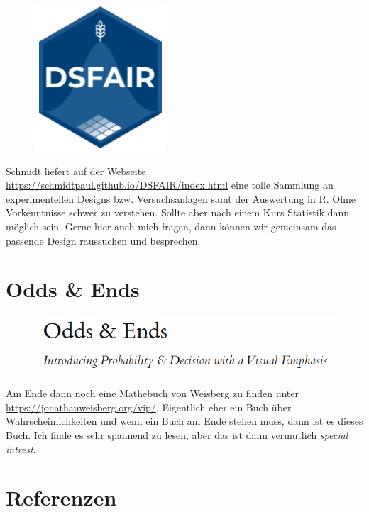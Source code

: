 \documentclass[
  letterpaper,
  DIV=11,
  oneside]{scrreport}
\begin{document}
\begin{figure}

{\centering \includegraphics{./images/dsfair.png}

}

\end{figure}

Schmidt liefert auf der Webseite
\url{https://schmidtpaul.github.io/DSFAIR/index.html} eine tolle
Sammlung an experimentellen Designs bzw. Versuchsanlagen samt der
Auswertung in R. Ohne Vorkenntnisse schwer zu verstehen. Sollte aber
nach einem Kurs Statistik dann möglich sein. Gerne hier auch mich
fragen, dann können wir gemeinsam das passende Design raussuchen und
besprechen.

\hypertarget{odds-ends}{%
\section{Odds \& Ends}\label{odds-ends}}

\begin{figure}

{\centering \includegraphics{./images/odds_and_ends.PNG}

}

\end{figure}

Am Ende dann noch eine Mathebuch von Weisberg zu finden unter
\url{https://jonathanweisberg.org/vip/}. Eigentlich eher ein Buch über
Wahrscheinlichkeiten und wenn ein Buch am Ende stehen muss, dann ist es
dieses Buch. Ich finde es sehr spannend zu lesen, aber das ist dann
vermutlich \emph{special intrest}.

\hypertarget{referenzen}{%
\section*{Referenzen}\label{referenzen}}
\end{document}
